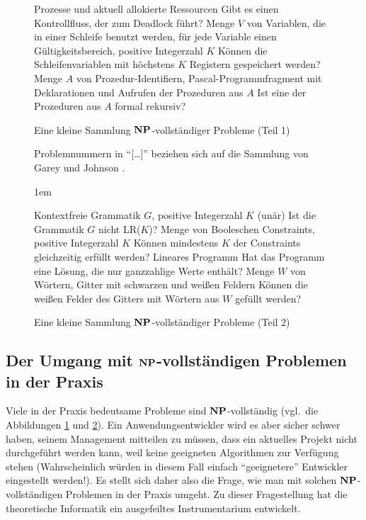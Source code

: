 \begin{figure}
\begin{center}
\begin{multicols}{2}
{Prozesse und aktuell allokierte Ressourcen}
{Gibt es einen Kontrollfluss, der zum Deadlock führt?}
%
{Menge $V$ von Variablen, die in einer Schleife benutzt werden, für jede
Variable einen Gültigkeitsbereich, positive Integerzahl $K$}
{Können die Schleifenvariablen mit höch\-stens $K$ Registern gespeichert werden?}
%
{Menge $A$ von Prozedur-Identifiern, Pascal-Programm\-fragment mit
Deklarationen und Aufrufen der Prozeduren aus $A$}
{Ist eine der Prozeduren aus $A$ formal rekursiv?}
\end{multicols}
\end{center}
\caption{Eine kleine Sammlung $\mathbf{N}\mathbf{P}$-vollständiger Probleme (Teil 1)}
\label{NPVollProbs1}
\end{figure}

\begin{figure}
\begin{center}
\footnotesize
Problemnummern in "`[\dots]"' beziehen sich auf die Sammlung von
Garey und Johnson \cite{GaJo79}.

\columnsep1em
\begin{multicols}{2}
{Kontextfreie Grammatik $G$, positive Integerzahl $K$ (unär)}
{Ist die Grammatik $G$ nicht LR($K$)?}
%
{Menge von Booleschen Constraints, positive Integerzahl $K$}
{Können mindestens $K$ der Constraints gleichzeitig erfüllt werden?}
%
{Lineares Programm}
{Hat das Programm eine Lösung, die nur ganzzahlige Werte enthält?}
%
%
{Menge $W$ von Wörtern, Gitter mit schwarzen und weißen Feldern}
{Können die weißen Felder des Gitters mit Wörtern aus $W$ gefüllt werden?}%
\end{multicols}
\caption{Eine kleine Sammlung $\mathbf{N}\mathbf{P}$-vollständiger Probleme (Teil 2)}
\label{NPVollProbs2}
\end{center}
\end{figure}

\subsection{Der Umgang mit $\mathbf{N}\mathbf{P}$-vollständigen Problemen in der Praxis}

Viele in der Praxis bedeutsame Probleme sind $\mathbf{N}\mathbf{P}$-vollständig
(vgl.~die Abbildungen \ref{NPVollProbs1} und \ref{NPVollProbs2}). Ein
Anwendungsentwickler wird es aber sicher schwer haben, seinem
Management mitteilen zu müssen, dass ein aktuelles Projekt nicht
durchgeführt werden kann, weil keine geeigneten Algorithmen zur
Verfügung stehen (Wahrscheinlich würden in diesem Fall einfach
"`geeignetere"' Entwickler eingestellt werden!). Es stellt sich daher
also die Frage, wie man mit solchen $\mathbf{N}\mathbf{P}$-vollständigen Problemen in
der Praxis umgeht. Zu dieser Fragestellung hat die theoretische
Informatik ein ausgefeiltes Instrumentarium entwickelt.

